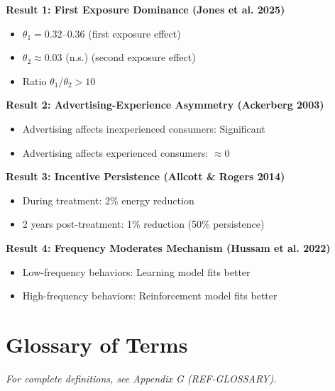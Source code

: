 \documentclass[11pt, a4paper]{article}
\begin{document}
\begin{tcolorbox}[colback=purple!5!white, colframe=purple!75!black,
    title=Summary of Empirical Results from Learning Literature]

\textbf{Result 1: First Exposure Dominance (Jones et al. 2025)}
\begin{itemize}[nosep]
    \item $\theta_1 = 0.32$--$0.36$ (first exposure effect)
    \item $\theta_2 \approx 0.03$ (n.s.) (second exposure effect)
    \item Ratio $\theta_1/\theta_2 > 10$
\end{itemize}

\textbf{Result 2: Advertising-Experience Asymmetry (Ackerberg 2003)}
\begin{itemize}[nosep]
    \item Advertising affects inexperienced consumers: Significant
    \item Advertising affects experienced consumers: $\approx 0$
\end{itemize}

\textbf{Result 3: Incentive Persistence (Allcott \& Rogers 2014)}
\begin{itemize}[nosep]
    \item During treatment: 2\% energy reduction
    \item 2 years post-treatment: 1\% reduction (50\% persistence)
\end{itemize}

\textbf{Result 4: Frequency Moderates Mechanism (Hussam et al. 2022)}
\begin{itemize}[nosep]
    \item Low-frequency behaviors: Learning model fits better
    \item High-frequency behaviors: Reinforcement model fits better
\end{itemize}

\end{tcolorbox}


\section{Glossary of Terms}
\label{sec:lrn-glossary}

\textit{For complete definitions, see Appendix G (REF-GLOSSARY).}
\end{document}
